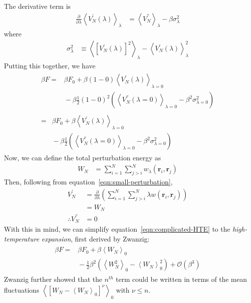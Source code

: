 \documentclass[letterpaper,twocolumn,amsmath,amssymb,prb]{revtex4-1}
\newcommand{\1}{\ensuremath{\textbf{r}_1}}
\newcommand{\2}{\ensuremath{\textbf{r}_2}}
\begin{document}
The derivative term is
\begin{align}
  \frac{\partial}{\partial\lambda}\left\langle V_N^{'}(\lambda) \right\rangle_{\lambda} &= \left\langle V_N^{''} \right\rangle_\lambda - \beta\sigma_\lambda^2
\end{align}
where
\begin{align}
  \sigma_\lambda^2 &\equiv \left\langle \left[ V_N^{'}(\lambda) \right]^2 \right\rangle_\lambda - \left\langle V_N^{'}(\lambda) \right\rangle^2_\lambda
\end{align}
Putting this together, we have
\begin{align}
  \begin{split}
    \beta F = &{} \beta F_0 + \beta(1 - 0)\left\langle V_N^{'}(\lambda) \right\rangle_{\lambda = 0} \\ &{} - \beta\frac{1}{2}(1 - 0)^2\left(\left\langle V_N^{''}(\lambda = 0) \right\rangle_{\lambda = 0} - \beta^2\sigma^2_{\lambda = 0} \right)
  \end{split} \\
  \begin{split}
    =&{}  \beta F_0 + \beta\left\langle V_N^{'}(\lambda) \right\rangle_{\lambda = 0} \\ &{} - \beta\frac{1}{2}\left(\left\langle V_N^{''}(\lambda = 0) \right\rangle_{\lambda = 0} - \beta^2\sigma^2_{\lambda = 0} \right) \label{eqn:complicated-HTE}
  \end{split}
\end{align}
Now, we can define the total perturbation energy as
\begin{align}
  W_N &= \sum_{i=1}^N\sum_{j>i}^N w_\lambda(\mathbf{r}_i,\mathbf{r}_j)
\end{align}
Then, following from equation~\ref{eqn:small-perturbation},
\begin{align}
  V_N^{'} &= \frac{\partial}{\partial\lambda}\left(\sum_{i=1}^N\sum_{j>i}^N \lambda w(\mathbf{r}_i,\mathbf{r}_j)\right) \nonumber \\
  &= W_N \\
  \therefore V_N^{''} &= 0
\end{align}
With this in mind, we can simplify equation~\ref{eqn:complicated-HTE} to the \emph{high-temperature expansion}, first derived by Zwanzig:\cite{Zwanzig54}
\begin{align}
  \begin{split}
    \beta F = &{} \beta F_0 + \beta\left\langle W_N \right\rangle_0  \\ &{} - \frac{1}{2}\beta^2\left( \left\langle W_N^2 \right\rangle_0 - \left\langle W_N \right\rangle_0^2 \right) + \mathcal{O}(\beta^3)
  \end{split}
\end{align}
Zwanzig further showed that the $n^{th}$ term could be written in terms of the mean fluctuations $\left\langle \left[ W_N - \left\langle W_N\right\rangle_0 \right]^\nu \right\rangle_0$ with $\nu \leq n$.
\end{document}
